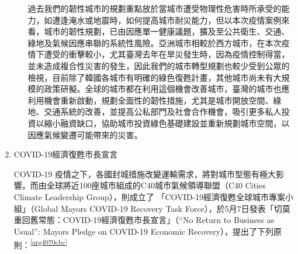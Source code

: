 \documentclass[a4paper,12pt]{article}
\begin{document}
\begin{enumerate}
\begin{itemize}
過去我們的韌性城市的規劃重點放於當城市遭受物理性危害時所承受的能力，如遭逢淹水或地震時，如何提高城市耐災能力，但以本次疫情案例來看，城市的韌性規劃，已由因應單一健康議題，擴及至公共衛生、交通、綠地及氣候因應串聯的系統性風險。亞洲城市相較於西方城市，在本次疫情下遭受的衝擊較小，尤其臺灣去年在旱災發生時，因為疫情控制得當，並未造成複合性災害的發生，因此我們的城市轉型規劃也較少受到公眾的檢視，目前除了韓國各城市有明確的綠色復甦計畫，其他城市尚未有大規模的政策研擬。全球的城市都在利用這個機會改善城市，臺灣的城市也應利用機會重新啟動，規劃全面性的韌性措施，尤其是城市開放空間、綠地、交通系統的改善，並提高公私部門及社會合作機會，吸引更多私人投資以縮小融資缺口，協助城市投資綠色基礎建設並重新規劃城市空間，以因應氣候變遷可能帶來的災害。\\
\end{itemize}

\item COVID-19經濟復甦市長宣言
\label{sec:org2678076}

COVID-19 疫情之下，各國封城措施改變運輸需求，將對城市型態有極大影響。而由全球將近100座城市組成的C40城市氣候領導聯盟（C40 Cities Climate Leadership Group），則成立了 「COVID-19經濟復甦全球城市專案小組」（Global Mayors COVID-19 Recovery Task Force），於5月7日發表「切莫重回舊常態：COVID-19經濟復甦市長宣言」（“No Return to Business as Usual”: Mayors Pledge on COVID-19 Economic Recovery），提出了下列原則：\textsuperscript{\ref{org4070cbc}}\\


\end{enumerate}
\end{document}
